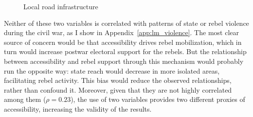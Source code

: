 \documentclass[12pt, notitlepage]{article}
\begin{document}
\begin{figure}[!ht]
    \centering

    \begin{minipage}{1\textwidth}
      \centering
      \hspace{25pt}
    \end{minipage}

    \caption{Local road infrastructure} \label{fig:map_roads}

\end{figure}


Neither of these two variables is correlated with patterns of state or rebel violence during the civil war, as I show in Appendix~\ref{app:lm_violence}.
The most clear source of concern would be that accessibility drives rebel mobilization, which in turn would increase postwar electoral support for the rebels.
But the relationship between accessibility and rebel support through this mechanism would probably run the opposite way: state reach would decrease in more isolated areas, facilitating rebel activity.
This bias would reduce the observed relationships, rather than confound it.
Moreover, given that they are not highly correlated among them ($\rho = 0.23$), the use of two variables provides two different proxies of accessibility, increasing the validity of the results.
\end{document}
